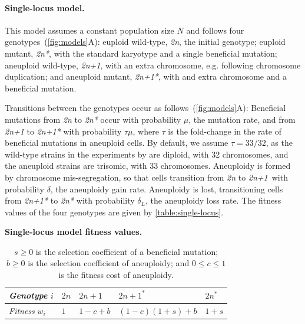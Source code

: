 \documentclass[12pt]{extarticle}
\newcommand{\euwt}{\emph{2n}}
\newcommand{\anwt}{\emph{2n+1}}
\newcommand{\eumt}{\emph{2n*}}
\newcommand{\anmt}{\emph{2n+1*}}
\begin{document}
\paragraph*{Single-locus model.}
This model assumes a constant population size $N$ and follows four genotypes~(\autoref{fig:models}A): euploid wild-type, \euwt, the initial genotype; 
euploid mutant, \eumt, with the standard karyotype and a single beneficial mutation; 
aneuploid wild-type, \anwt, with an extra chromosome, e.g. following chromosome duplication; and
aneuploid mutant, \anmt, with and extra chromosome and a beneficial mutation. 

Transitions between the genotypes occur as follows~(\autoref{fig:models}A): Beneficial mutations from \euwt\; to \eumt\; occur with probability $\mu$, the mutation rate, and from \anwt\; to \anmt\; with probability $\tau \mu$, where $\tau$ is the fold-change in the rate of beneficial mutations in aneuploid cells. By default, we assume $\tau=33/32$, as the wild-type \yeast strains in the experiments by \citep{Yona2012} are diploid, with 32 chromosomes, and the aneuploid strains are trisomic, with 33 chromosomes.
Aneuploidy is formed by chromosome mis-segregation, so that cells transition from \euwt\; to \anwt\ with probability $\delta$, the aneuploidy gain rate.
Aneuploidy is lost, transitioning cells from \anmt\; to \eumt\; with probability $\delta_L$, the aneuploidy loss rate.
The fitness values of the four genotypes are given by \autoref{table:single-locus}.

\begin{table}[h]
\centering
\caption{\textbf{Single-locus model fitness values.}}
\begin{tabular}{lllll}
\emph{Genotype} $i$ & $2n$ & $2n+1$ & $2n+1^*$ & $2n^*$ \\
\hline
\emph{Fitness} $w_i$ & $1$ & $1-c+b$ & $(1-c)(1+s)+b$ & $1+s$               
\end{tabular}
\label{table:single-locus}
\caption*{
$s \ge 0$ is the selection coefficient of a beneficial mutation;
$b \ge 0$ is the selection coefficient of aneuploidy; 
and $0 \le c \le 1$ is the fitness cost of aneuploidy.
}
\end{table}
\end{document}
